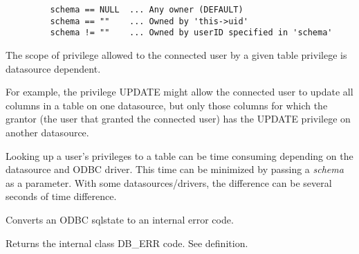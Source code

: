 \begin{verbatim}
         schema == NULL  ... Any owner (DEFAULT)
         schema == ""    ... Owned by 'this->uid'
         schema != ""    ... Owned by userID specified in 'schema'
\end{verbatim}



The scope of privilege allowed to the connected user by a given table
privilege is datasource dependent.

For example, the privilege UPDATE might allow the connected user to update
all columns in a table on one datasource, but only those columns for
which the grantor (the user that granted the connected user) has the UPDATE
privilege on another datasource.

Looking up a user's privileges to a table can be time consuming depending on the
datasource and ODBC driver.  This time can be minimized by passing a {\it schema}
as a parameter.  With some datasources/drivers, the difference can be several
seconds of time difference.


\label{wxdbtranslatesqlstate}


Converts an ODBC sqlstate to an internal error code.




Returns the internal class DB\_ERR code.  See  definition.

\label{wxdbwritesqllog}




